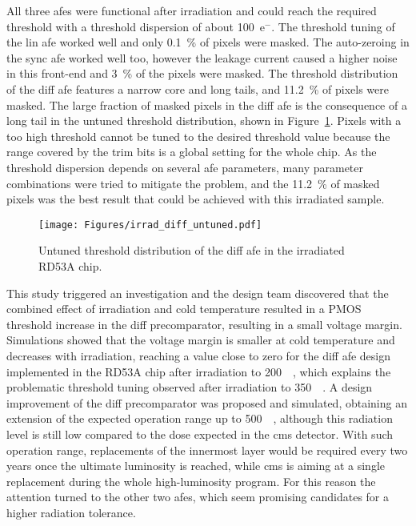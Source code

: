 All three \gls{afe}s were functional after irradiation and could reach the required threshold with a threshold dispersion of about \num{100}~e${^{-}}$. The threshold tuning of the \gls{lin} \gls{afe} worked well and only \SI{0.1}{\percent} of pixels were masked. The auto-zeroing in the \gls{sync} \gls{afe} worked well too, however the leakage current caused a higher noise in this front-end and \SI{3}{\percent} of the pixels were masked. The threshold distribution of the \gls{diff} \gls{afe} features a narrow core and long tails, and  \SI{11.2}{\percent} of pixels were masked.
The large fraction of masked pixels in the \gls{diff} \gls{afe} is the consequence of a long tail in the untuned threshold distribution, shown in Figure~\ref{fig:irrad_diff_untuned}. Pixels with a too high threshold cannot be tuned to the desired threshold value because the range covered by the trim bits is a global setting for the whole chip. As the threshold dispersion depends on several \gls{afe} parameters, many parameter combinations were tried to mitigate the problem, and the \SI{11.2}{\percent} of masked pixels was the best result that could be achieved with this irradiated sample.

\begin{figure}[t]
    \centering
    \texttt{[image: Figures/irrad\_diff\_untuned.pdf]}
    \caption{Untuned threshold distribution of the \gls{diff} \gls{afe} in the irradiated RD53A chip.}
    \label{fig:irrad_diff_untuned}
\end{figure}

This study triggered an investigation and the design team discovered that the combined effect of irradiation and cold temperature resulted in a PMOS threshold increase in the \gls{diff} precomparator, resulting in a small voltage margin.
Simulations showed that the voltage margin is smaller at cold temperature and decreases with irradiation, reaching a value close to zero for the \gls{diff} \gls{afe} design implemented in the RD53A chip after irradiation to \SI{200}{\mega\rad}, which explains the problematic threshold tuning observed after irradiation to \SI{350}{\mega\rad}.
A design improvement of the \gls{diff} precomparator was proposed and simulated, obtaining an extension of the expected operation range up to \SI{500}{\mega\rad}, although this radiation level is still low compared to the dose expected in the \gls{cms} detector. With such operation range, replacements of the innermost layer would be required every two years once the ultimate luminosity is reached, while \gls{cms} is aiming at a single replacement during the whole high-luminosity program. For this reason the attention turned to the other two \gls{afe}s, which seem promising candidates for a higher radiation tolerance.